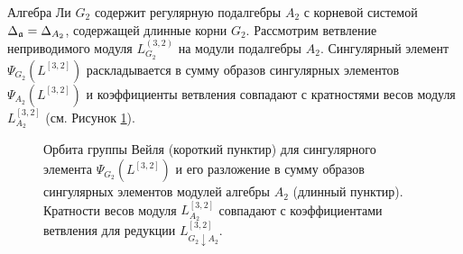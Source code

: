 \vspace{10mm}
\begin{example}
  Алгебра Ли  $G_{2}$ содержит регулярную подалгебры  $A_{2}$ с корневой системой $\Delta_{\mathfrak{a}}=\Delta_{A_{2}}$, содержащей длинные корни $G_{2}$. Рассмотрим ветвление неприводимого модуля $L_{G_{2}}^{(3,2)}$ на модули подалгебры $A_{2}$. Сингулярный элемент $\Psi_{G_{2}}(L^{[3,2]})$ раскладывается в сумму образов сингулярных элементов  $\Psi_{A_{2}}(L^{[3,2]})$ и коэффициенты ветвления совпадают с кратностями весов модуля $L^{[3,2]}_{A_{2}}$ (см. Рисунок \ref{fig:g2_splint}).


  \begin{figure}[h!bt]
  \noindent\centering{
   \texttt{[image: g2]}
  }

  \caption{Орбита группы Вейля  (короткий пунктир) для сингулярного элемента  $\Psi_{G_{2}}(L^{[3,2]})$ и его разложение в сумму образов сингулярных элементов модулей алгебры $A_{2}$ (длинный пунктир). Кратности весов модуля $L^{[3,2]}_{A_{2}}$ совпадают с коэффициентами ветвления для редукции $L^{[3,2]}_{G_{2}\downarrow A_{2}}$.}


 \label{fig:g2_splint}
\end{figure}

\end{example}

